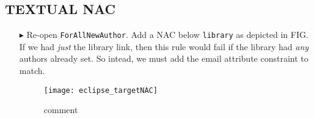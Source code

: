 \hypertarget{NAC tex}{}
\subsection{TEXTUAL NAC}
\texHeader

\begin{itemize}

\item[$\blacktriangleright$] Re-open \texttt{ForAllNewAuthor}. Add a NAC below \texttt{library} as depicted in FIG. If we had \emph{just} the library link,
then this rule would fail if the library had \emph{any} authors already set. So intead, we must add the email attribute constraint to match.

\begin{figure}[htbp]
\begin{center}
  \texttt{[image: eclipse\_targetNAC]}
  \caption{comment}
  \label{eclipse:existingAuthorNAC}
\end{center}
\end{figure}

\end{itemize}
